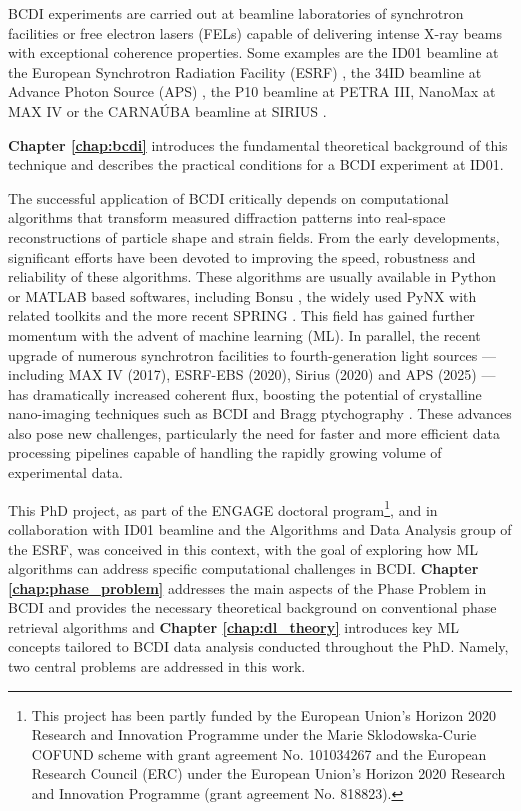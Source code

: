 BCDI experiments are carried out at beamline laboratories of synchrotron facilities or free electron lasers (FELs) capable 
of delivering intense X-ray beams with exceptional coherence properties. Some examples are the ID01 beamline at the European 
Synchrotron Radiation Facility (ESRF) \cite{leake_nanodiffraction_2019}, the 34ID beamline at Advance Photon Source (APS) \cite{Pateras:yi5095}, the P10 beamline at PETRA III, 
NanoMax at MAX IV \cite{MAXIV60nm} or the CARNAÚBA beamline at SIRIUS \cite{Tolentino_2017}. 

\textbf{Chapter \ref*{chap:bcdi}} introduces the fundamental theoretical background of this technique and 
describes the practical conditions for a BCDI experiment at ID01.

The successful application of BCDI critically depends on computational algorithms that transform measured diffraction 
patterns into real-space reconstructions of particle shape and strain fields. From the early developments,
significant efforts have been devoted to improving the speed, robustness and reliability of these algorithms. These 
algorithms are usually available in Python or MATLAB based softwares, including Bonsu \cite{Newton2012Bonsu}, the widely 
used PyNX \cite{favre-nicolin_pynx_2020} with related toolkits \cite{Simonne2022Gwaihir, Atlan2023cdiutils} and the 
more recent SPRING \cite{Colombo2025SPRING}. 
This field has gained further momentum with the advent of machine learning (ML). In parallel, the recent upgrade of 
numerous synchrotron facilities to fourth-generation light sources — including MAX IV (2017), ESRF-EBS (2020), 
Sirius (2020) and APS (2025) — has dramatically increased coherent flux, boosting the potential of crystalline 
nano-imaging techniques such as BCDI and Bragg ptychography \cite{Li2022, leake_nanodiffraction_2019, PhysRevLett.121.256101, Chamard2015}. These advances also pose new 
challenges, particularly the need for faster and more efficient data processing pipelines capable of handling the rapidly 
growing volume of experimental data.

This PhD project, as part of the ENGAGE doctoral program\footnote[1]{This project has been partly funded by the European Union's 
Horizon 2020 Research and Innovation Programme under the Marie Sklodowska-Curie COFUND scheme with grant agreement 
No. 101034267 and the European Research Council (ERC) under the European Union's Horizon 2020 Research and Innovation 
Programme (grant agreement No. 818823).}, and in collaboration with ID01 beamline and the Algorithms 
and Data Analysis group of the ESRF, was conceived in this context, with the goal of exploring how ML algorithms can address specific 
computational challenges in BCDI. \textbf{Chapter \ref{chap:phase_problem}} addresses the main aspects of the Phase 
Problem in BCDI and provides the necessary theoretical background on 
conventional phase retrieval algorithms and \textbf{Chapter \ref{chap:dl_theory}} introduces key ML concepts tailored 
to BCDI data analysis conducted throughout the PhD. Namely, two central problems are addressed in this work.

